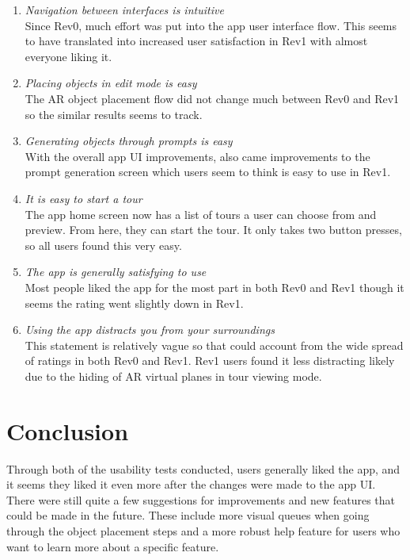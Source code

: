 \documentclass{article}
\begin{document}
\begin{enumerate}
    \item \textit{Navigation between interfaces is intuitive}\\
    Since Rev0, much effort was put into the app user interface flow. This seems to have translated into increased user satisfaction in Rev1 with almost everyone liking it.
    \item \textit{Placing objects in edit mode is easy}\\
    The AR object placement flow did not change much between Rev0 and Rev1 so the similar results seems to track.
    \item \textit{Generating objects through prompts is easy}\\
    With the overall app UI improvements, also came improvements to the prompt generation screen which users seem to think is easy to use in Rev1.
    \item \textit{It is easy to start a tour}\\
    The app home screen now has a list of tours a user can choose from and preview. From here, they can start the tour. It only takes two button presses, so all users found this very easy.
    \item \textit{The app is generally satisfying to use}\\
    Most people liked the app for the most part in both Rev0 and Rev1 though it seems the rating went slightly down in Rev1.
    \item \textit{Using the app distracts you from your surroundings}\\
    This statement is relatively vague so that could account from the wide spread of ratings in both Rev0 and Rev1. Rev1 users found it less distracting likely due to the hiding of AR virtual planes in tour viewing mode.
\end{enumerate}

\section{Conclusion}
Through both of the usability tests conducted, users generally liked the app, and it seems they liked it even more after the changes were made to the app UI. There were still quite a few suggestions for improvements and new features that could be made in the future. These include more visual queues when going through the object placement steps and a more robust help feature for users who want to learn more about a specific feature.
\end{document}
